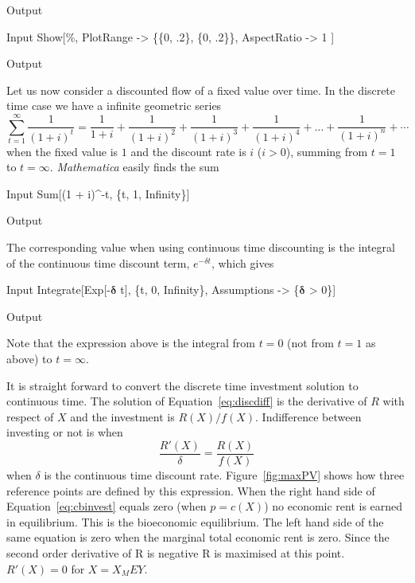 \documentclass[11pt,fleqn]{book} %
\begin{document}
\begin{theorem}[Discounting]
\begin{mmaCell}[moregraphics={moreig={scale=.7}}]{Output}
\end{mmaCell}
\begin{mmaCell}{Input}
  Show[\%, 
    PlotRange   -> \{\{0, .2\}, \{0, .2\}\}, 
    AspectRatio -> 1
  ]
\end{mmaCell}
\begin{mmaCell}[moregraphics={moreig={scale=.7}}]{Output}
\end{mmaCell}
Let us now consider a discounted flow of a fixed value over time. In the discrete time case we have a infinite geometric series
\begin{equation*} 
  \sum_{t=1}^{\infty} \frac{1}{(1 + i)^t} = \frac{1}{1+i} + \frac{1}{(1 + i)^2} + \frac{1}{(1 + i)^3} + \frac{1}{(1 + i)^4} + \dots + \frac{1}{(1 + i)^n} + \dotsb
\end{equation*}
when the fixed value is $1$ and the discount rate is $i$ ($i > 0$), summing from $t = 1$ to $t = \infty$. \textit{Mathematica} easily finds the sum
\begin{mmaCell}{Input}
  Sum[(1 + i)^-t, \{t, 1, Infinity\}]
\end{mmaCell}
\begin{mmaCell}{Output}
\end{mmaCell}
The corresponding value when using continuous time discounting is the integral of the continuous time discount term, $e^{-\delta t}$, which gives
\begin{mmaCell}{Input}
  Integrate[Exp[-\(\pmb{\delta}\) t], \{t, 0, Infinity\}, Assumptions -> \{\(\pmb{\delta}\) > 0\}]
\end{mmaCell}
\begin{mmaCell}{Output}
\end{mmaCell}
Note that the expression above is the integral from $t = 0$ (not from $t = 1$ as above) to $t = \infty$.
\label{code:discounting}
\end{theorem}

It is straight forward to convert the discrete time investment solution to continuous time. The solution of Equation~\ref{eq:discdiff} is the derivative of $R$ with respect of $X$ and the investment is $R(X)/f(X)$. Indifference between investing or not is when
\begin{equation} 
\label{eq:cbinvest}
 \frac{R'(X)}{\delta} = \frac{R(X)}{f(X)}
\end{equation}
when $\delta$ is the continuous time discount rate. Figure~\ref{fig:maxPV} shows how three reference points are defined by this expression. When the right hand side of Equation~\ref{eq:cbinvest} equals zero (when $p = c(X)$) no economic rent is earned in equilibrium. This is the bioeconomic equilibrium. The left hand side of the same equation is zero when the marginal total economic rent is zero. Since the second order derivative of R is negative R is maximised at this point. $R'(X) = 0$ for $X = X_MEY$.
\end{document}
